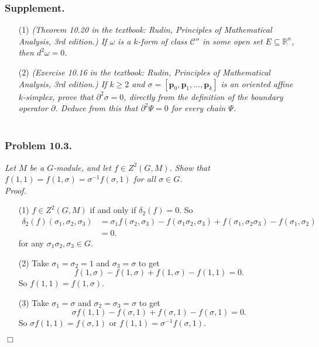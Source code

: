 \documentclass{article}
\begin{document}
\subsubsection*{Supplement.}
\begin{enumerate}
\item[(1)]
  \emph{(Theorem 10.20 in the textbook:
  Rudin, Principles of Mathematical Analysis, 3rd edition.)
  If $\omega$ is a $k$-form of class $\mathscr{C}''$
  in some open set $E \subseteq \mathbb{R}^n$, then $d^2 \omega = 0$.}

\item[(2)]
  \emph{(Exercise 10.16 in the textbook:
  Rudin, Principles of Mathematical Analysis, 3rd edition.)
  If $k \geq 2$ and $\sigma = [\mathbf{p}_0,\mathbf{p}_1,\ldots,\mathbf{p}_k]$
  is an oriented affine $k$-simplex, prove that $\partial^2 \sigma = 0$,
  directly from the definition of the boundary operator $\partial$.
  Deduce from this that $\partial^2 \Psi = 0$ for every chain $\Psi$.} \\\\
\end{enumerate}






\subsubsection*{Problem 10.3.}
\emph{Let $M$ be a $G$-module, and let $f \in Z^2(G,M)$.
Show that $f(1,1) = f(1,\sigma) = \sigma^{-1} f(\sigma, 1)$ for all $\sigma \in G$.} \\



\emph{Proof.}
\begin{enumerate}
\item[(1)]
  $f \in Z^2(G,M)$ if and only if $\delta_2(f) = 0$.
  So
  \begin{align*}
    \delta_2(f)(\sigma_1, \sigma_2, \sigma_3)
    &= \sigma_1 f(\sigma_2, \sigma_3)
        - f(\sigma_1\sigma_2,\sigma_3)
        + f(\sigma_1, \sigma_2\sigma_3)
        - f(\sigma_1, \sigma_2) \\
    &= 0.
  \end{align*}
  for any $\sigma_1 \sigma_2, \sigma_3 \in G$.

\item[(2)]
  Take $\sigma_1 = \sigma_2 = 1$ and $\sigma_3 = \sigma$ to get
  \[
    f(1,\sigma) - f(1,\sigma) + f(1,\sigma) - f(1,1) = 0.
  \]
  So $f(1,1) = f(1,\sigma)$.

\item[(3)]
  Take $\sigma_1 = \sigma$ and $\sigma_2 = \sigma_3 = \sigma$ to get
  \[
    \sigma f(1,1) - f(\sigma,1) + f(\sigma,1) - f(\sigma,1) = 0.
  \]
  So $\sigma f(1,1) = f(\sigma,1)$ or $f(1,1) = \sigma^{-1}f(\sigma,1)$.
\end{enumerate}
$\Box$ \\\\
\end{document}
